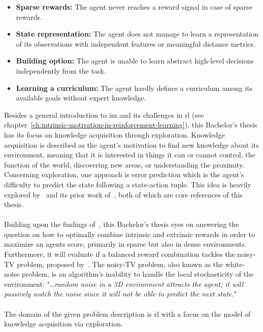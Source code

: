 \documentclass[draft,final]{vutinfth} %
\newcommand{\p}[1]{see p. #1}
\begin{document}
    \begin{itemize}
        \item \textbf{Sparse rewards:} The agent never reaches a reward signal in case of sparse rewards.
        \item \textbf{State representation:} The agent does not manage to learn a representation of its observations with independent features or meaningful distance metrics.
        \item \textbf{Building option:} The agent is unable to learn abstract high-level decisions independently from the task.
        \item \textbf{Learning a curriculum:} The agent hardly defines a curriculum among its available goals without expert knowledge.
        \label{enm:challenges}
    \end{itemize}

    Besides a general introduction to \gls{im} and its challenges in \gls{rl} (see chapter~\ref{ch:intrinsic-motivation-in-reinforcement-learning}), this Bachelor's thesis has its focus on knowledge acquisition through exploration.
    Knowledge acquisition is described as the agent's motivation to find new knowledge about its environment, meaning that it is interested in things it can or cannot control, the function of the world, discovering new areas, or understanding the proximity.
    Concerning exploration, one approach is error prediction which is the agent's difficulty to predict the state following a state-action tuple.
    This idea is heavily explored by~\cite{burda_large-scale_2018-1} and its prior work of~\cite{pathak_curiosity-driven_2017-1}, both of which are core references of this thesis.
    \\\\
    Building upon the findings of~\citeauthor{burda_large-scale_2018-1}, this Bachelor's thesis eyes on answering the question on how to optimally combine intrinsic and extrinsic rewards in order to maximize an agents score, primarily in sparse but also in dense environments.
    Furthermore, it will evaluate if a balanced reward combination tackles the noisy-TV problem, proposed by~\cite{schmidhuber_formal_2010}.
    The noisy-TV problem, also known as the white-noise problem, is an algorithm's inability to handle the local stochasticity of the environment: "\textit{\ldots random noise in a 3D environment attracts the agent; it will passively watch the noise since it will not be able to predict the next state.}"\cite[\p{10}]{aubret_survey_2019}
    \\\\
    The domain of the given problem description is \gls{rl} with a focus on the model of knowledge acquisition via exploration.
\end{document}
